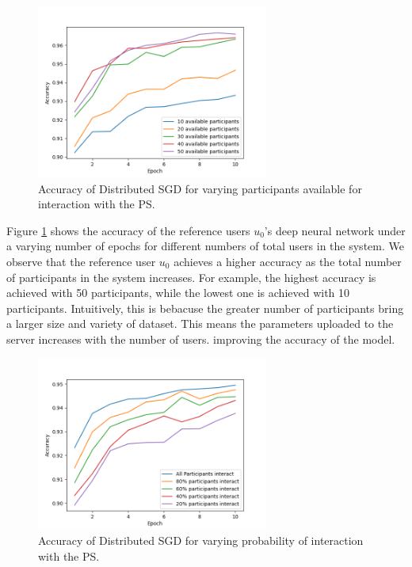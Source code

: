 \documentclass[letterpaper]{article}
\begin{document}
\begin{flushleft}
{\begin{figure}[H]
  \centering
    \includegraphics[width=3in]{VaryingPoolofParticipants.png}
    \caption[Distributed SGD for varying participant.]{\label{fig:VaryingPoolofParticipants} Accuracy of Distributed SGD for varying participants available for interaction with the PS.}
  \end{figure}



Figure \ref{fig:VaryingPoolofParticipants} shows the accuracy of the reference users $u_0$'s deep neural network under a varying number of epochs for different numbers of total users in the system. We observe that 
the reference user $u_0$ achieves a higher accuracy as the total number of participants in the system increases. For example, the
highest accuracy is achieved with 50 participants, while the lowest one is achieved with 10 participants. Intuitively, this is bebacuse the greater number of participants bring a larger size and variety of dataset. This means the parameters uploaded to the server increases with the number of users. improving the accuracy of the model.



\begin{figure}[H]
  \centering
    \includegraphics[width=3in]{VaryingProbabilityInteraction.png}
    \caption[SGD for varying probability of interaction.]{\label{fig:VaryingProbabilityInteraction} Accuracy of Distributed SGD for varying probability of interaction with the PS.}
  \end{figure}


}
\end{flushleft}
\end{document}
